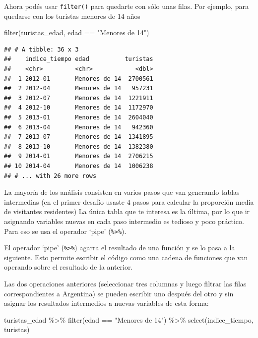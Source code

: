 \documentclass[
  openany]{book}
\newenvironment{Shaded}{\begin{snugshade}}{\end{snugshade}}
\newcommand{\FunctionTok}[1]{\textcolor[rgb]{0.00,0.00,0.00}{#1}}
\newcommand{\NormalTok}[1]{#1}
\newcommand{\SpecialCharTok}[1]{\textcolor[rgb]{0.00,0.00,0.00}{#1}}
\newcommand{\StringTok}[1]{\textcolor[rgb]{0.31,0.60,0.02}{#1}}
\begin{document}
Ahora podés usar \texttt{filter()} para quedarte con sólo unas filas.
Por ejemplo, para quedarse con los turistas menores de 14 años

\begin{Shaded}
\begin{Highlighting}[]
\FunctionTok{filter}\NormalTok{(turistas\_edad, edad }\SpecialCharTok{==} \StringTok{"Menores de 14"}\NormalTok{)}
\end{Highlighting}
\end{Shaded}

\begin{verbatim}
## # A tibble: 36 x 3
##    indice_tiempo edad          turistas
##    <chr>         <chr>            <dbl>
##  1 2012-01       Menores de 14  2700561
##  2 2012-04       Menores de 14   957231
##  3 2012-07       Menores de 14  1221911
##  4 2012-10       Menores de 14  1172970
##  5 2013-01       Menores de 14  2604040
##  6 2013-04       Menores de 14   942360
##  7 2013-07       Menores de 14  1341895
##  8 2013-10       Menores de 14  1382380
##  9 2014-01       Menores de 14  2706215
## 10 2014-04       Menores de 14  1006238
## # ... with 26 more rows
\end{verbatim}

La mayoría de los análisis consisten en varios pasos que van generando tablas intermedias (en el primer desafío usaste 4 pasos para calcular la proporción media de visitantes residentes)
La única tabla que te interesa es la última, por lo que ir asignando variables nuevas en cada paso intermedio es tedioso y poco práctico.
Para eso se usa el operador `pipe' (\texttt{\%\textgreater{}\%}).

El operador `pipe' (\texttt{\%\textgreater{}\%}) agarra el resultado de una función y se lo pasa a la siguiente.
Esto permite escribir el código como una cadena de funciones que van operando sobre el resultado de la anterior.

Las dos operaciones anteriores (seleccionar tres columnas y luego filtrar las filas correspondientes a Argentina) se pueden escribir uno después del otro y sin asignar los resultados intermedios a nuevas variables de esta forma:

\begin{Shaded}
\begin{Highlighting}[]
\NormalTok{turistas\_edad }\SpecialCharTok{\%\textgreater{}\%} 
  \FunctionTok{filter}\NormalTok{(edad }\SpecialCharTok{==} \StringTok{"Menores de 14"}\NormalTok{) }\SpecialCharTok{\%\textgreater{}\%} 
  \FunctionTok{select}\NormalTok{(indice\_tiempo, turistas)}
\end{Highlighting}
\end{Shaded}
\end{document}
